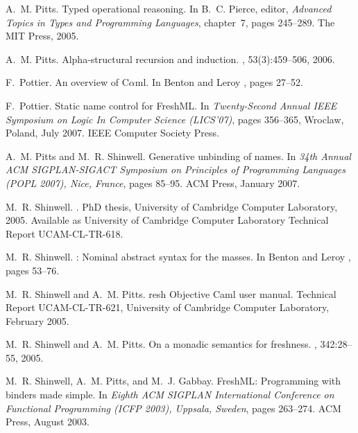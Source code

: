 \documentclass{LMCS}
\theoremstyle{plain}
\theoremstyle{definition}
\begin{document}
\begin{thebibliography}{MTHM97}
A.~M. Pitts.
\newblock Typed operational reasoning.
\newblock In B.~C. Pierce, editor, {\em Advanced Topics in Types and
  Programming Languages}, chapter~7, pages 245--289. The MIT Press, 2005.

A.~M. Pitts.
\newblock Alpha-structural recursion and induction.
, 53(3):459--506, 2006.

F.~Pottier.
\newblock An overview of {C$\alpha$ml}.
\newblock In Benton and Leroy \cite{BentonPN:ML2005}, pages 27--52.

F.~Pottier.
\newblock Static name control for {FreshML}.
\newblock In {\em Twenty-Second Annual {IEEE} Symposium on Logic In Computer
  Science (LICS'07)}, pages 356--365, Wroclaw, Poland, July 2007. IEEE Computer
  Society Press.

A.~M. Pitts and M.~R. Shinwell.
\newblock Generative unbinding of names.
\newblock In {\em 34th Annual ACM SIGPLAN-SIGACT Symposium on Principles of
  Programming Languages (POPL 2007), Nice, France}, pages 85--95. ACM Press,
  January 2007.

M.~R. Shinwell.
.
\newblock PhD thesis, University of Cambridge Computer Laboratory, 2005.
\newblock Available as University of Cambridge Computer Laboratory Technical
  Report UCAM-CL-TR-618.

M.~R. Shinwell.
: Nominal abstract syntax for the masses.
\newblock In Benton and Leroy \cite{BentonPN:ML2005}, pages 53--76.

M.~R. Shinwell and A.~M. Pitts.
resh {O}bjective {C}aml user manual.
\newblock Technical Report UCAM-CL-TR-621, University of Cambridge Computer
  Laboratory, February 2005.

M.~R. Shinwell and A.~M. Pitts.
\newblock On a monadic semantics for freshness.
, 342:28--55, 2005.

M.~R. Shinwell, A.~M. Pitts, and M.~J. Gabbay.
\newblock Fresh{ML}: Programming with binders made simple.
\newblock In {\em Eighth {ACM SIGPLAN} International Conference on Functional
  Programming ({ICFP} 2003), Uppsala, Sweden}, pages 263--274. ACM Press,
  August 2003.


\end{thebibliography}
\end{document}

